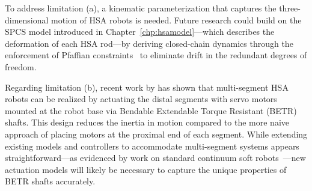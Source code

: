 
To address limitation (a), a kinematic parameterization that captures the three-dimensional motion of \gls{HSA} robots is needed. Future research could build on the \gls{SPCS} model introduced in Chapter~\ref{chp:hsamodel}—which describes the deformation of each HSA rod—by deriving closed-chain dynamics through the enforcement of Pfaffian constraints~\citep{armanini2021discrete} to eliminate drift in the redundant degrees of freedom.

Regarding limitation (b), recent work by \citet{good2025torque} has shown that multi-segment \gls{HSA} robots can be realized by actuating the distal segments with servo motors mounted at the robot base via Bendable Extendable Torque Resistant (BETR) shafts. This design reduces the inertia in motion compared to the more naive approach of placing motors at the proximal end of each segment. While extending existing models and controllers to accommodate multi-segment systems appears straightforward—as evidenced by work on standard continuum soft robots~\citep{della2020model}—new actuation models will likely be necessary to capture the unique properties of BETR shafts accurately.

